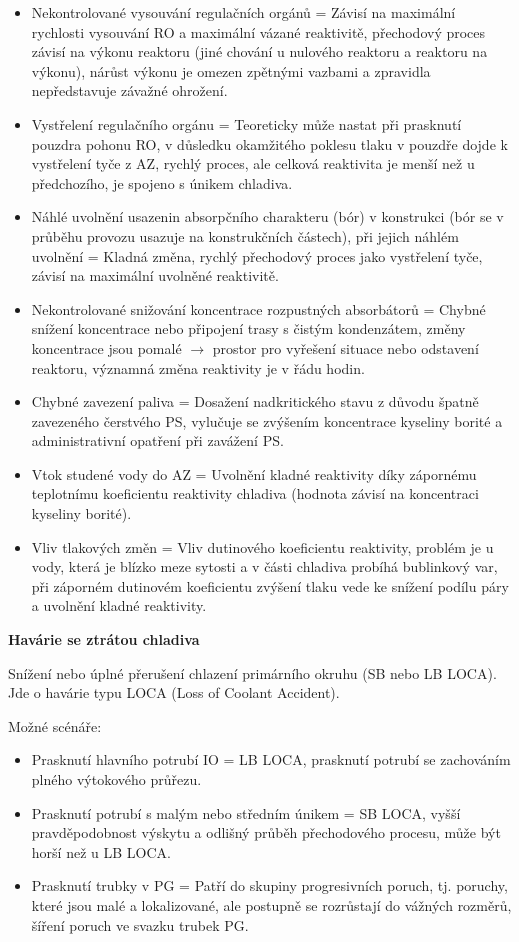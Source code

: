 \begin{itemize}
    \item Nekontrolované vysouvání regulačních orgánů = Závisí na maximální rychlosti vysouvání RO a maximální vázané reaktivitě, přechodový proces závisí na výkonu reaktoru (jiné chování u nulového reaktoru a reaktoru na výkonu), nárůst výkonu je omezen zpětnými vazbami a zpravidla nepředstavuje závažné ohrožení.
    \item Vystřelení regulačního orgánu = Teoreticky může nastat při prasknutí pouzdra pohonu RO, v důsledku okamžitého poklesu tlaku v pouzdře dojde k vystřelení tyče z AZ, rychlý proces, ale celková reaktivita je menší než u předchozího, je spojeno s únikem chladiva.
    \item Náhlé uvolnění usazenin absorpčního charakteru (bór) v konstrukci (bór se v průběhu provozu usazuje na konstrukčních částech), při jejich náhlém uvolnění = Kladná změna, rychlý přechodový proces jako vystřelení tyče, závisí na maximální uvolněné reaktivitě.
    \item Nekontrolované snižování koncentrace rozpustných absorbátorů = Chybné snížení koncentrace nebo připojení trasy s čistým kondenzátem, změny koncentrace jsou pomalé $\rightarrow$ prostor pro vyřešení situace nebo odstavení reaktoru, významná změna reaktivity je v řádu hodin.
    \item Chybné zavezení paliva = Dosažení nadkritického stavu z důvodu špatně zavezeného čerstvého PS, vylučuje se zvýšením koncentrace kyseliny borité a administrativní opatření při zavážení PS.
    \item Vtok studené vody do AZ = Uvolnění kladné reaktivity díky zápornému teplotnímu koeficientu reaktivity chladiva (hodnota závisí na koncentraci kyseliny borité).
    \item Vliv tlakových změn = Vliv dutinového koeficientu reaktivity, problém je u vody, která je blízko meze sytosti a v části chladiva probíhá bublinkový var, při záporném dutinovém koeficientu zvýšení tlaku vede ke snížení podílu páry a uvolnění kladné reaktivity.
\end{itemize}

\textbf{Havárie se ztrátou chladiva}

Snížení nebo úplné přerušení chlazení primárního okruhu (SB nebo LB LOCA). Jde o havárie typu LOCA (Loss of Coolant Accident).

Možné  scénáře:

\begin{itemize}
    \item Prasknutí hlavního potrubí IO = LB LOCA, prasknutí potrubí se zachováním plného výtokového průřezu.
    \item Prasknutí potrubí s malým nebo středním únikem = SB LOCA, vyšší pravděpodobnost výskytu a odlišný průběh přechodového procesu, může být horší než u LB LOCA.
    \item Prasknutí trubky v PG = Patří do skupiny progresivních poruch, tj. poruchy, které jsou malé a lokalizované, ale postupně se rozrůstají do vážných rozměrů, šíření poruch ve svazku trubek PG.
\end{itemize}

